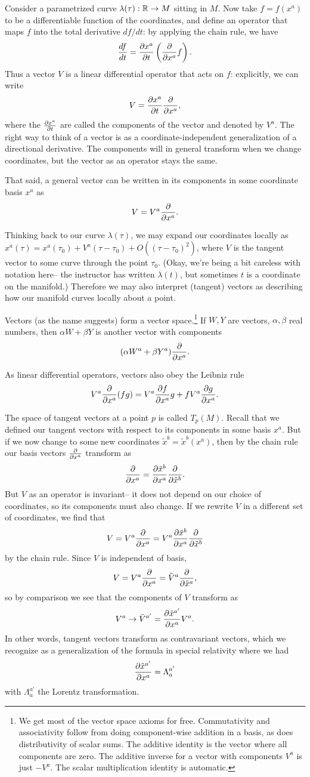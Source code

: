 Consider a parametrized curve $\lambda(\tau):\RR\to M$ sitting in $M$. Now take $f=f(x^a)$ to be a differentiable function of the coordinates, and define an operator that maps $f$ into the total derivative $df/dt$: by applying the chain rule, we have
$$\frac{df}{dt}=\P{x^a}{t}\left(\P{}{x^a}f\right).$$
Thus a vector $V$ is a linear differential operator that acts on $f$: explicitly, we can write $$V=\P{x^a}{t}\P{}{x^a},$$ where the $\P{x^a}{t}$ are called the components of the vector and denoted by $V^a$. The right way to think of a vector is as a coordinate-independent generalization of a directional derivative. The components will in general transform when we change coordinates, but the vector as an operator stays the same.

That said, a general vector can be written in its components in some coordinate basis $x^a$ as
$$V= V^a \P{}{x^a}.$$

Thinking back to our curve $\lambda(\tau)$, we may expand our coordinates locally as $x^a(\tau)=x^a (\tau_0)+V^a (\tau-\tau_0)+O((\tau-\tau_0)^2)$, where $V$ is the tangent vector to some curve through the point $\tau_0$. (Okay, we're being a bit careless with notation here-- the instructor has written $\lambda(t)$, but sometimes $t$ is a coordinate on the manifold.) Therefore we may also interpret (tangent) vectors as describing how our manifold curves locally about a point.

Vectors (as the name suggests) form a vector space.\footnote{We get most of the vector space axioms for free. Commutativity and associativity follow from doing component-wise addition in a basis, as does distributivity of scalar sums. The additive identity is the vector where all components are zero. The additive inverse for a vector with components $V^a$ is just $-V^a$. The scalar multiplication identity is automatic.} 
If $W, Y$ are vectors, $\alpha,\beta$ real numbers, then $\alpha W + \beta Y$ is another vector with components
$$(\alpha W^a+\beta Y^a)\P{}{x^a}.$$

As linear differential operators, vectors also obey the Leibniz rule
$$V^a \P{}{x^a}(fg)= V^a \P{f}{x^a} g+ f V^a \P{g}{x^a}.$$

The space of tangent vectors at a point $p$ is called $T_p(M)$. Recall that we defined our tangent vectors with respect to its components in some basis $x^a$. But if we now change to some new coordinates $\tilde x^b = \tilde x^b(x^a)$, then by the chain rule our basis vectors $\P{}{x^a}$ transform as
$$\P{}{x^a}=\P{\tilde x^{b}}{x^a}\frac{\partial}{\partial \tilde x^b}.$$
But $V$ as an operator is invariant-- it does not depend on our choice of coordinates, so its components must also change. If we rewrite $V$ in a different set of coordinates, we find that
$$V=V^a \P{}{x^a} = V^a \P{\tilde x^b}{x^a}\frac{\p}{\p\tilde x^b}$$
by the chain rule. Since $V$ is independent of basis,
$$V=V^a \P{}{x^a}= \tilde V^a \P{}{\tilde x^a},$$ so by comparison we see that the components of $V$ transform as
$$V^a\to \tilde V^{a'} = \frac{\p\tilde x^{a'}}{\p x^a} V^a.$$
In other words, tangent vectors transform as contravariant vectors, which we recognize as a generalization of the formula in special relativity where we had $$\P{\tilde x^{a'}}{x^a}=\Lambda^{a'}_{a}$$
with $\Lambda^{a'}_{a}$ the Lorentz transformation.


